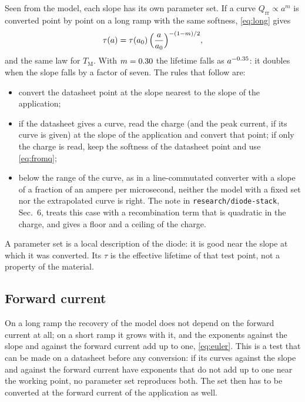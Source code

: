 \documentclass[10pt,a4paper]{scrartcl}
\newcommand{\Qrr}{Q_\mathrm{rr}}
\newcommand{\TM}{T_\mathrm{M}}
\begin{document}
Seen from the model, each slope has its own parameter set. If a curve $\Qrr \propto a^{m}$ is converted point by point on a long ramp with the same softness, \eqref{eq:long} gives
\begin{equation}
\tau(a) = \tau(a_0)\,\Bigl(\frac{a}{a_0}\Bigr)^{-(1-m)/2} ,
\label{eq:taucurve}
\end{equation}
and the same law for $\TM$. With $m = 0.30$ the lifetime falls as $a^{-0.35}$: it doubles when the slope falls by a factor of seven. The rules that follow are:
\begin{itemize}
\item convert the datasheet point at the slope nearest to the slope of the application;
\item if the datasheet gives a curve, read the charge (and the peak current, if its curve is given) at the slope of the application and convert that point; if only the charge is read, keep the softness of the datasheet point and use \eqref{eq:fromq};
\item below the range of the curve, as in a line-commutated converter with a slope of a fraction of an ampere per microsecond, neither the model with a fixed set nor the extrapolated curve is right. The note in \texttt{research/diode-stack}, Sec.~6, treats this case with a recombination term that is quadratic in the charge, and gives a floor and a ceiling of the charge.
\end{itemize}
A parameter set is a local description of the diode: it is good near the slope at which it was converted. Its $\tau$ is the effective lifetime of that test point, not a property of the material.

\subsection{Forward current}
On a long ramp the recovery of the model does not depend on the forward current at all; on a short ramp it grows with it, and the exponents against the slope and against the forward current add up to one, \eqref{eq:euler}. This is a test that can be made on a datasheet before any conversion: if its curves against the slope and against the forward current have exponents that do not add up to one near the working point, no parameter set reproduces both. The set then has to be converted at the forward current of the application as well.
\end{document}
